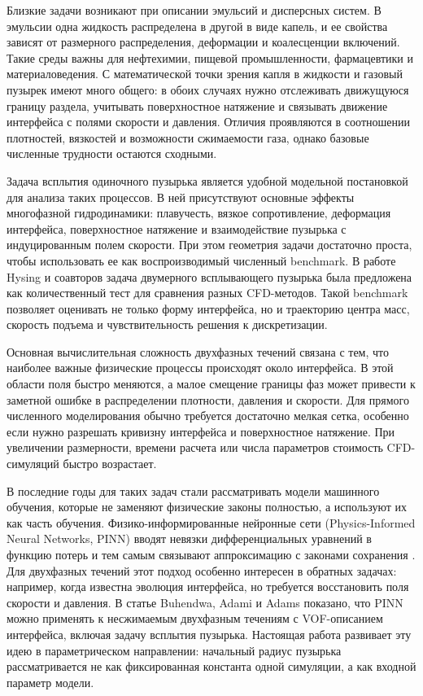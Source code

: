 \documentclass[12pt,a4paper]{article}
\begin{document}
Близкие задачи возникают при описании эмульсий и дисперсных систем. В эмульсии
одна жидкость распределена в другой в виде капель, и ее свойства зависят от
размерного распределения, деформации и коалесценции включений. Такие среды
важны для нефтехимии, пищевой промышленности, фармацевтики и материаловедения.
С математической точки зрения капля в жидкости и газовый пузырек имеют много
общего: в обоих случаях нужно отслеживать движущуюся границу раздела,
учитывать поверхностное натяжение и связывать движение интерфейса с полями
скорости и давления. Отличия проявляются в соотношении плотностей, вязкостей и
возможности сжимаемости газа, однако базовые численные трудности остаются
сходными.

Задача всплытия одиночного пузырька является удобной модельной постановкой для
анализа таких процессов. В ней присутствуют основные эффекты многофазной
гидродинамики: плавучесть, вязкое сопротивление, деформация интерфейса,
поверхностное натяжение и взаимодействие пузырька с индуцированным полем
скорости. При этом геометрия задачи достаточно проста, чтобы использовать ее
как воспроизводимый численный benchmark. В работе Hysing и соавторов
\cite{Hysing2009} задача двумерного всплывающего пузырька была предложена как
количественный тест для сравнения разных CFD-методов. Такой benchmark позволяет
оценивать не только форму интерфейса, но и траекторию центра масс, скорость
подъема и чувствительность решения к дискретизации.

Основная вычислительная сложность двухфазных течений связана с тем, что
наиболее важные физические процессы происходят около интерфейса. В этой области
поля быстро меняются, а малое смещение границы фаз может привести к заметной
ошибке в распределении плотности, давления и скорости. Для прямого численного
моделирования обычно требуется достаточно мелкая сетка, особенно если нужно
разрешать кривизну интерфейса и поверхностное натяжение. При увеличении
размерности, времени расчета или числа параметров стоимость CFD-симуляций
быстро возрастает.

В последние годы для таких задач стали рассматривать модели машинного обучения,
которые не заменяют физические законы полностью, а используют их как часть
обучения. Физико-информированные нейронные сети (Physics-Informed Neural
Networks, PINN) вводят невязки дифференциальных уравнений в функцию потерь и
тем самым связывают аппроксимацию с законами сохранения \cite{Raissi2019}.
Для двухфазных течений этот подход особенно интересен в обратных задачах:
например, когда известна эволюция интерфейса, но требуется восстановить поля
скорости и давления. В статье Buhendwa, Adami и Adams \cite{Buhendwa2021}
показано, что PINN можно применять к несжимаемым двухфазным течениям с
VOF-описанием интерфейса, включая задачу всплытия пузырька. Настоящая работа
развивает эту идею в параметрическом направлении: начальный радиус пузырька
рассматривается не как фиксированная константа одной симуляции, а как входной
параметр модели.
\end{document}
